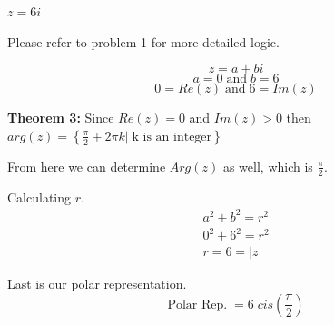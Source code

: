 \begin{problem}[3.]
    $z = 6i$
\end{problem}

\begin{solution}
    Please refer to problem 1 for more detailed logic. 
    
    \[z = a + bi\]
    \[a = 0 \; \text{and} \; b = 6 \]
    \[ \boxed{0 = Re(z)} \; \text{and} \; \boxed{ 6 = Im(z) }\]
    
    \textbf{Theorem 3:} Since $Re(z) = 0$ and $Im(z) > 0$ then $\boxed{arg(z) = \left\{ \frac{\pi}{2} + 2\pi k | \; \text{k is an integer} \right\} }$
    
    From here we can determine $Arg(z)$ as well, which is $\boxed{\frac{\pi}{2}}$. 
    
    Calculating $r$.
    \begin{align}
        a^2 + b^2 = r^2 \\
        0^2 + 6^2 = r^2 \\
        \boxed{r = 6 = |z|}
    \end{align}
    
    Last is our polar representation. 
    \[\boxed{ \text{Polar Rep.} \; = 6 \; cis \left( \frac{\pi}{2} \right) }\]
\end{solution}